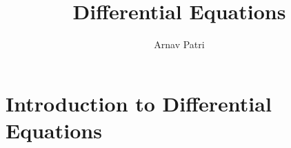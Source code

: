 \documentclass[12pt, A4]{report}
\title{Differential Equations}
\author{Arnav Patri}
\begin{document}
	\maketitle
	\tableofcontents
	\chapter{Introduction to Differential Equations}
		
\end{document}
